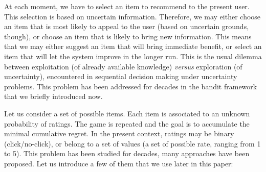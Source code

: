 \documentclass[twoside,leqno,twocolumn]{article}
\newcommand{\pp}[1]{\color{red}(pp) #1\color{black}}
\newcommand{\hai}[1]{\color{blue}(hai) #1\color{black}}
\begin{document}

At each moment, we have to select an item to recommend to the present user. This selection is based on uncertain information. Therefore, we may either choose an item that is most likely to appeal to the user (based on uncertain grounds, though), or choose an item that is likely to bring new information. This means that we may either suggest an item that will bring immediate benefit, or select an item that will let the system improve in the longer run. This is the usual dilemma between exploitation (of already available knowledge) \textit{versus} exploration (of uncertainty), encountered in sequential decision making under uncertainty problems. This problem has been addressed for decades in the bandit framework that we briefly introduced now.

Let us consider a set of possible items. Each item is associated to an unknown probability of ratings. The game is repeated and the goal is to accumulate the minimal cumulative regret. In the present context, ratings may be binary (click/no-click), or belong to a set of values (a set of possible rate, ranging from 1 to 5). This problem has been studied for decades, many approaches have been proposed. Let us introduce a few of them that we use later in this paper:
\end{document}
